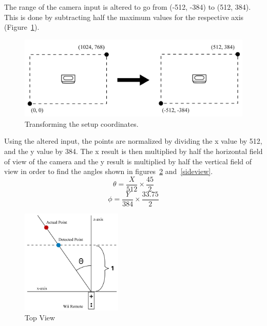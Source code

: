 \documentclass[a4paper,twoside]{article}
\begin{document}
\begin{indenteddescription} \item[Step 1:]The range of the camera input is
altered to go from (-512, -384) to (512, 384). This is done by subtracting half
the maximum values for the respective axis (Figure~\ref{coordinates}). 

\begin{figure}[h] \begin{center} \includegraphics[width = 7.5
cm]{Diagram3_CoordinateShift.png} \end{center} \caption{Transforming the setup
coordinates.} \label{coordinates} \end{figure}

\item[Step 2:] Using the altered input, the points are normalized by dividing
the x value by 512, and the y value by 384. The x result is then multiplied by
half the horizontal field of view of the camera and the y result is multiplied
by half the vertical field of view in order to find the angles shown in
figures~\ref{topview} and~\ref{sideview}.  \begin{equation} \theta =
\frac{X}{512} \times \frac{45}{2} \end{equation} \begin{equation} \phi =
\frac{Y}{384} \times \frac{33.75}{2} \end{equation}


\begin{figure}[t] \begin{center} \includegraphics[height =
5cm]{Diagram1_CalcTopView.png} \end{center} \caption{Top View} \label{topview}
\end{figure}


\end{indenteddescription}
\end{document}
